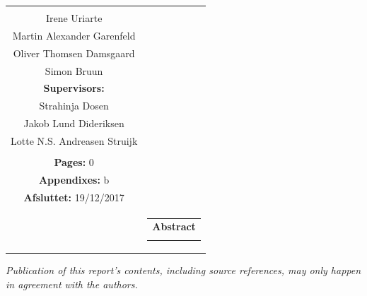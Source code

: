 \begin{titlepage}
\begin{nopagebreak}
{\begin{tabular}{cc}
{{\textbf{Collaborators:}\\
Irene Uriarte \\
Martin Alexander Garenfeld \\
Oliver Thomsen Damsgaard \\
Simon Bruun \\

\textbf{Supervisors:}\\
Strahinja Dosen \\
Jakob Lund Dideriksen \\
Lotte N.S. Andreasen Struijk \\
}\\


\textbf{Pages:} 0\\
\textbf{Appendixes:} b \\
\textbf{Afsluttet:} 19/12/2017\\

\vfill } &
\parbox{7cm}{
  \vspace{.15cm}
  \hfill
  \begin{tabular}{l}
  {\textbf{Abstract}}\bigskip \\
  \fbox{
    \parbox{6.5cm}{\bigskip
     {\vfill{\small 
     \bigskip}}
     }}
   \end{tabular}}
\end{tabular}} %


\centering
\textit{Publication of this report's contents, including source references, may only happen in agreement with the authors.}\\


\end{nopagebreak}
\end{titlepage}
%